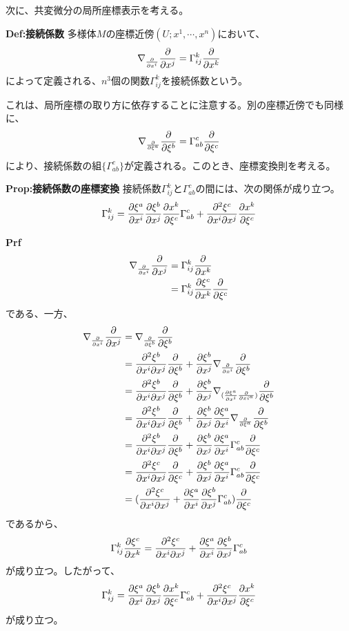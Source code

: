 \documentclass[a4paper,11pt]{jsarticle}
\numberwithin{equation}{section}
\begin{document}
次に、共変微分の局所座標表示を考える。
\begin{itembox}[l]{\textbf{Def:接続係数}}
    多様体$M$の座標近傍$(U;x^1,\cdots,x^n)$において、
    \begin{equation}
        \nabla_{\pdv{x^i}}\pdv{x^j} = \Gamma_{ij}^k\pdv{x^k}
    \end{equation}
    によって定義される、$n^3$個の関数$\Gamma_{ij}^k$を接続係数という。
\end{itembox}
これは、局所座標の取り方に依存することに注意する。別の座標近傍でも同様に、
\begin{equation}
    \nabla_{\pdv{\xi^a}}\pdv{\xi^b} = \Gamma_{ab}^c\pdv{\xi^c}
\end{equation}
により、接続係数の組$\{\Gamma_{ab}^c\}$が定義される。このとき、座標変換則を考える。
\begin{itembox}[l]{\textbf{Prop:接続係数の座標変換}}
    接続係数$\Gamma_{ij}^k$と$\Gamma_{ab}^c$の間には、次の関係が成り立つ。
    \begin{equation}
        \Gamma_{ij}^k = \pdv{\xi^a}{x^i}\pdv{\xi^b}{x^j}\pdv{x^k}{\xi^c}\Gamma_{ab}^c + \pdv[2]{\xi^c}{x^i}{x^j}\pdv{x^k}{\xi^c}
    \end{equation}
\end{itembox}
\textbf{Prf}\\
\begin{align}
    \nabla_{\pdv{x^i}}\pdv{x^j} &= \Gamma_{ij}^k\pdv{x^k}\\
    &= \Gamma_{ij}^k\pdv{\xi^c}{x^k}\pdv{\xi^c}\\
\end{align}
である、一方、
\begin{align}
    \nabla_{\pdv{x^i}}\pdv{x^j} &= \nabla_{\pdv{\xi^b}}\pdv{\xi^b}\\
    &= \pdv[2]{\xi^b}{x^i}{x^j}\pdv{\xi^b} + \pdv{\xi^b}{x^j}\nabla_{\pdv{x^i}}\pdv{\xi^b}\\
    &= \pdv[2]{\xi^b}{x^i}{x^j}\pdv{\xi^b} + \pdv{\xi^b}{x^j}\nabla_{(\pdv{\xi^a}{x^i}\pdv{xi^a})}\pdv{\xi^b}\\
    &= \pdv[2]{\xi^b}{x^i}{x^j}\pdv{\xi^b} + \pdv{\xi^b}{x^j}\pdv{\xi^a}{x^i}\nabla_{\pdv{\xi^a}}\pdv{\xi^b}\\
    &= \pdv[2]{\xi^b}{x^i}{x^j}\pdv{\xi^b} + \pdv{\xi^b}{x^j}\pdv{\xi^a}{x^i}\Gamma_{ab}^c\pdv{\xi^c}\\
    &= \pdv[2]{\xi^c}{x^i}{x^j}\pdv{\xi^c} + \pdv{\xi^b}{x^j}\pdv{\xi^a}{x^i}\Gamma_{ab}^c\pdv{\xi^c}\\
    &=(\pdv[2]{\xi^c}{x^i}{x^j} + \pdv{\xi^a}{x^i}\pdv{\xi^b}{x^j}\Gamma_{ab}^c)\pdv{\xi^c}
\end{align}
であるから、
\begin{equation}
    \Gamma_{ij}^k \pdv{\xi^c}{x^k} = \pdv[2]{\xi^c}{x^i}{x^j} + \pdv{\xi^a}{x^i}\pdv{\xi^b}{x^j}\Gamma_{ab}^c
\end{equation}
が成り立つ。したがって、
\begin{equation}
    \Gamma_{ij}^k = \pdv{\xi^a}{x^i}\pdv{\xi^b}{x^j}\pdv{x^k}{\xi^c}\Gamma_{ab}^c + \pdv[2]{\xi^c}{x^i}{x^j}\pdv{x^k}{\xi^c}
\end{equation}
が成り立つ。\hfill\qedsymbol
\end{document}
